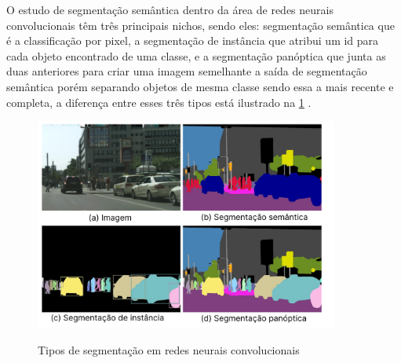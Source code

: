 
O estudo de segmentação semântica dentro da área de redes neurais convolucionais têm três principais nichos, sendo eles: segmentação semântica que é a classificação por pixel, a segmentação de instância que atribui um id para cada objeto encontrado de uma classe, e a segmentação panóptica que junta as duas anteriores para criar uma imagem semelhante a saída de segmentação semântica porém separando objetos de mesma classe sendo essa a mais recente e completa, a diferença entre esses três tipos está ilustrado na \cref{fig:segentacoes} \space\cite{dp_semantic_segmantation, lapix}. 

\begin{figure}[ht]
	\caption{Tipos de segmentação em redes neurais convolucionais}
	\centering %
	\includegraphics[width=10cm]{figures/segmantations.png} %
	\label{fig:segentacoes}
\end{figure}


